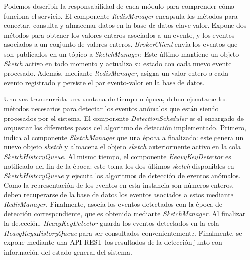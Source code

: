 \documentclass[a4paper,10pt, oneside]{article}
\begin{document}
Podemos describir la responsabilidad de cada módulo para comprender cómo funciona el servicio. El componente \textit{RedisManager} encapsula los métodos para conectar, consulta y almacenar datos en la base de datos clave-valor. Expone dos métodos para obtener los valores enteros asociados a un evento, y los eventos asociados a un conjunto de valores enteros. \textit{BrokerClient} envía los eventos que son publicados en un tópico a \textit{SketchManager}. Este último mantiene un objeto \textit{Sketch} activo en todo momento y actualiza su estado con cada nuevo evento procesado. Además, mediante \textit{RedisManager}, asigna un valor entero a cada evento registrado y persiste el par evento-valor en la base de datos.

Una vez transcurrida una ventana de tiempo o época, deben ejecutarse los métodos necesarios para detectar los eventos anómalos que están siendo procesados por el sistema. El componente \textit{DetectionScheduler} es el encargado de orquestar los diferentes pasos del algoritmo de detección implementado. Primero, indica al componente \textit{SketchManager} que una época a finalizado: este genera un nuevo objeto \textit{sketch} y almacena el objeto \textit{sketch} anteriormente activo en la cola \textit{SketchHistoryQueue}. Al mismo tiempo, el componente \textit{HeavyKeyDetector} es notificado del fin de la época: este toma los dos últimos \textit{sketch} disponibles en \textit{SketchHistoryQueue} y ejecuta los algoritmos de detección de eventos anómalos. Como la representación de los eventos en esta instancia son números enteros, deben recuperarse de la base de datos los eventos asociados a estos mediante \textit{RedisManager}. Finalmente, asocia los eventos detectados con la época de detección correspondiente, que es obtenida mediante \textit{SketchManager}.
Al finalizar la detección, \textit{HeavyKeyDetector} guarda los eventos detectados en la cola \textit{HeavyKeysHistoryQueue} para ser consultados convenientemente. Finalmente, se expone mediante una API REST los resultados de la detección junto con información del estado general del sistema.
\end{document}
